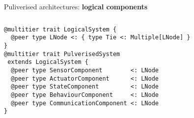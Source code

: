\begin{frame}[fragile]{Puliverised architectures: \textbf{logical components}}
  \begin{columns}
    \begin{column}{0.7\textwidth}
      \begin{cardTiny}
        \begin{verbatim}
@multitier trait LogicalSystem {
  @peer type LNode <: { type Tie <: Multiple[LNode] }
}
@multitier trait PulverisedSystem 
 extends LogicalSystem {  
  @peer type SensorComponent        <: LNode 
  @peer type ActuatorComponent      <: LNode
  @peer type StateComponent         <: LNode
  @peer type BehaviourComponent     <: LNode
  @peer type CommunicationComponent <: LNode
}
        \end{verbatim}
      \end{cardTiny}
    \end{column}
    \begin{column}{0.3\textwidth}
    \end{column}
  \end{columns}
\end{frame}